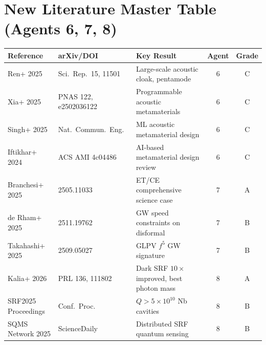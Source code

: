 \documentclass[11pt,a4paper]{article}
\begin{document}
\section{New Literature Master Table (Agents 6, 7, 8)}

\begin{longtable}{p{3cm}p{3cm}p{5cm}cc}
\toprule
\textbf{Reference} & \textbf{arXiv/DOI} & \textbf{Key Result} & \textbf{Agent} & \textbf{Grade} \\
\midrule
\endhead
Ren+ 2025 & Sci.\ Rep.\ 15, 11501 & Large-scale acoustic cloak, pentamode & 6 & C \\
Xia+ 2025 & PNAS 122, e2502036122 & Programmable acoustic metamaterials & 6 & C \\
Singh+ 2025 & Nat.\ Commun.\ Eng.\ & ML acoustic metamaterial design & 6 & C \\
Iftikhar+ 2024 & ACS AMI 4c04486 & AI-based metamaterial design review & 6 & C \\
Branchesi+ 2025 & 2505.11033 & ET/CE comprehensive science case & 7 & A \\
de Rham+ 2025 & 2511.19762 & GW speed constraints on disformal & 7 & B \\
Takahashi+ 2025 & 2509.05027 & GLPV $f^5$ GW signature & 7 & B \\
Kalia+ 2026 & PRL 136, 111802 & Dark SRF $10\times$ improved, best photon mass & 8 & A \\
SRF2025 Proceedings & Conf.\ Proc.\ & $Q > 5\times10^{10}$ Nb cavities & 8 & B \\
SQMS Network 2025 & ScienceDaily & Distributed SRF quantum sensing & 8 & B \\
\bottomrule
\end{longtable}
\end{document}
